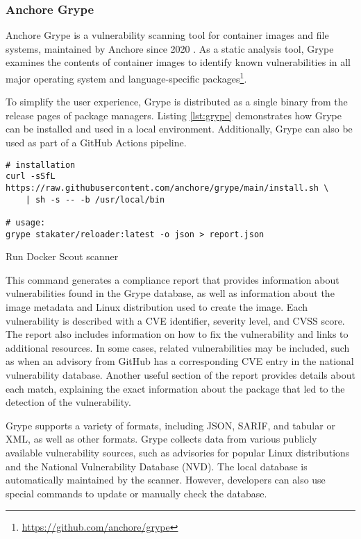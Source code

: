 \subsubsection{Anchore Grype}

Anchore Grype is a vulnerability scanning tool for container images and file systems, maintained by Anchore since 2020 \cite{s:anchore}. As a static analysis tool, Grype examines the contents of container images to identify known vulnerabilities in all major operating system and language-specific packages\footnote{\url{https://github.com/anchore/grype}}.

To simplify the user experience, Grype is distributed as a single binary from the release pages of package managers. Listing \ref{lst:grype} demonstrates how Grype can be installed and used in a local environment. Additionally, Grype can also be used as part of a GitHub Actions pipeline.


\begin{listing}[htp]
    \centering
    \begin{minipage}{1\linewidth}
        \begin{verbatim}
# installation
curl -sSfL https://raw.githubusercontent.com/anchore/grype/main/install.sh \
    | sh -s -- -b /usr/local/bin

# usage:
grype stakater/reloader:latest -o json > report.json
        \end{verbatim}
    \end{minipage}
    \caption{Run Docker Scout scanner}
    \label{lst:grype}
\end{listing}

This command generates a compliance report that provides information about vulnerabilities found in the Grype database, as well as information about the image metadata and Linux distribution used to create the image. Each vulnerability is described with a CVE identifier, severity level, and CVSS score. The report also includes information on how to fix the vulnerability and links to additional resources. In some cases, related vulnerabilities may be included, such as when an advisory from GitHub has a corresponding CVE entry in the national vulnerability database. Another useful section of the report provides details about each match, explaining the exact information about the package that led to the detection of the vulnerability.

Grype supports a variety of formats, including JSON, SARIF, and tabular or XML, as well as other formats. Grype collects data from various publicly available vulnerability sources, such as advisories for popular Linux distributions and the National Vulnerability Database (NVD). The local database is automatically maintained by the scanner. However, developers can also use special commands to update or manually check the database.

